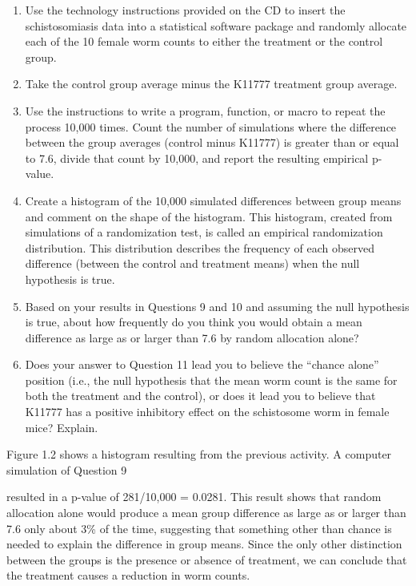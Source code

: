 \documentclass[
]{report}
\begin{document}
\begin{enumerate}
\def\labelenumi{\arabic{enumi}.}
\setcounter{enumi}{6}
\item
  Use the technology instructions provided on the CD to insert the schistosomiasis data into a statistical
  software package and randomly allocate each of the 10 female worm counts to either the treatment or the
  control group.
\item
  Take the control group average minus the K11777 treatment group average.
\item
  Use the instructions to write a program, function, or macro to repeat the process 10,000 times. Count
  the number of simulations where the difference between the group averages (control minus K11777) is
  greater than or equal to 7.6, divide that count by 10,000, and report the resulting empirical p-value.
\item
  Create a histogram of the 10,000 simulated differences between group means and comment on the
  shape of the histogram. This histogram, created from simulations of a randomization test, is called an
  empirical randomization distribution. This distribution describes the frequency of each observed
  difference (between the control and treatment means) when the null hypothesis is true.
\item
  Based on your results in Questions 9 and 10 and assuming the null hypothesis is true, about how frequently
  do you think you would obtain a mean difference as large as or larger than 7.6 by random allocation alone?
\item
  Does your answer to Question 11 lead you to believe the ``chance alone'' position (i.e., the null hypothesis
  that the mean worm count is the same for both the treatment and the control), or does it lead you to
  believe that K11777 has a positive inhibitory effect on the schistosome worm in female mice? Explain.
\end{enumerate}

Figure 1.2 shows a histogram resulting from the previous activity. A computer simulation of Question 9

resulted in a p-value of 281/10,000 = 0.0281. This result shows that random allocation alone would produce
a mean group difference as large as or larger than 7.6 only about 3\% of the time, suggesting that something
other than chance is needed to explain the difference in group means. Since the only other distinction between
the groups is the presence or absence of treatment, we can conclude that the treatment causes a reduction in
worm counts.
\end{document}
